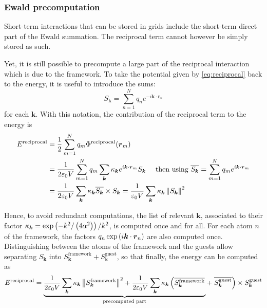 \documentclass[main.tex]{subfiles}
\begin{document}
\subsubsection{Ewald precomputation}

Short-term interactions that can be stored in grids include the short-term direct part of the Ewald summation. The reciprocal term cannot however be simply stored as such.

Yet, it is still possible to precompute a large part of the reciprocal interaction which is due to the framework. To take the potential given by \cref{eq:reciprocal} back to the energy, it is useful to introduce the sums:
\[S_{\boldsymbol k} = \sum_{n=1}^N q_n e^{-i\boldsymbol k\cdot \boldsymbol r_n}\label{eq:Sk}\]
for each $\boldsymbol k$. With this notation, the contribution of the reciprocal term to the energy is
\[\begin{split}
E^\text{reciprocal} &= \frac12\sum_{m=1}^N q_m \Phi^\text{reciprocal}(\boldsymbol{r}_m)
\\&= \frac1{2\varepsilon_0V} \sum_{m=1}^N q_m \sum_{\boldsymbol{k}} \kappa_{\boldsymbol k} e^{i\boldsymbol k\cdot\boldsymbol r_m}S_{\boldsymbol{k}} \quad\text{ then using }\overline{S_{\boldsymbol{k}}} = \sum_{m=1}^N q_me^{i\boldsymbol k\cdot\boldsymbol r_m}
\\&= \frac1{2\varepsilon_0V} \sum_{\boldsymbol{k}} \kappa_{\boldsymbol k} \overline{S_{\boldsymbol{k}}} \times S_{\boldsymbol{k}}
= \frac1{\varepsilon_0V} \sum_{\boldsymbol{k}} \kappa_{\boldsymbol k} \left\|S_{\boldsymbol{k}}\right\|^2
\end{split}\]

Hence, to avoid redundant computations, the list of relevant $\boldsymbol{k}$, associated to their factor $\kappa_{\boldsymbol k} = \exp\left(-k^2/\left(4\alpha^2\right)\right)/k^2$, is computed once and for all. For each atom $n$ of the framework, the factors $q_n\exp\left(i\boldsymbol{k}\cdot\boldsymbol{r}_n\right)$ are also computed once.
Distinguishing between the atoms of the framework and the guests allow separating $S_{\boldsymbol k}$ into $S_{\boldsymbol k}^\text{framework} + S_{\boldsymbol k}^\text{guest}$, so that finally, the energy can be computed as
\[E^\text{reciprocal} = \underbrace{
	\frac1{2\varepsilon_0V} \sum_{\boldsymbol k} \kappa_{\boldsymbol k}\left\|S_{\boldsymbol k}^\text{framework}\right\|^2 + \frac1{2\varepsilon_0V} \sum_{\boldsymbol k}\kappa_{\boldsymbol k} \left(\overline{S_{\boldsymbol k}^\text{framework}}\right.
}_\text{precomputed part}
+ \left.\overline{S_{\boldsymbol k}^\text{guest}}\right) \times S_{\boldsymbol k}^\text{guest}\label{eq:reciprocal_decomposed}\]
\end{document}
